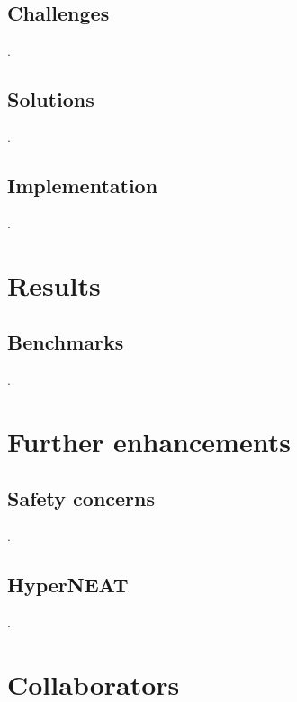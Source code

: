 \documentclass[11pt]{article}
\begin{document}
		\subsection{Challenges}
			.
		\subsection{Solutions}
			.
		\subsection{Implementation}
			.
	\newpage

	\section{Results}
		\subsection{Benchmarks}
			.
	\newpage

	\section{Further enhancements}
		\subsection{Safety concerns}
			.
		\subsection{HyperNEAT}
			.
	\newpage

	\section{Collaborators}
		
	\newpage

	\nocite{*}
	
	
\end{document}
